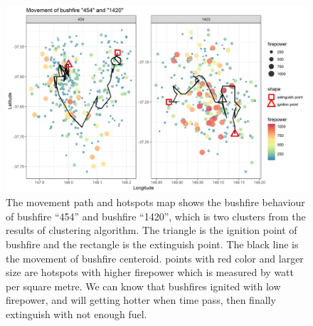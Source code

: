 \documentclass[11pt,a4paper,]{article}
\begin{document}
\begin{figure}
\centering
\includegraphics[width=5.20833in]{figures/fire_mov.jpg}
\caption{The movement path and hotspots map shows the bushfire behaviour
of bushfire ``454'' and bushfire ``1420'', which is two clusters from
the results of clustering algorithm. The triangle is the ignition point
of bushfire and the rectangle is the extinguish point. The black line is
the movement of bushfire centeroid. points with red color and larger
size are hotspots with higher firepower which is measured by watt per
square metre. We can know that bushfires ignited with low firepower, and
will getting hotter when time pass, then finally extinguish with not
enough fuel. \label{fig:mov}}
\end{figure}

\normalfont
\end{document}
